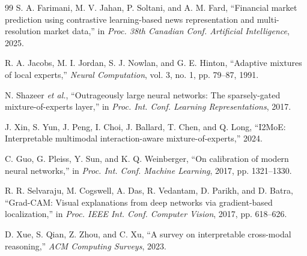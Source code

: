﻿\documentclass[conference]{IEEEtran}
\begin{document}
\begin{thebibliography}{99}
S. A. Farimani, M. V. Jahan, P. Soltani, and A. M. Fard, ``Financial market prediction using contrastive learning-based news representation and multi-resolution market data,'' in \emph{Proc. 38th Canadian Conf. Artificial Intelligence}, 2025.

R. A. Jacobs, M. I. Jordan, S. J. Nowlan, and G. E. Hinton, ``Adaptive mixtures of local experts,'' \emph{Neural Computation}, vol. 3, no. 1, pp. 79--87, 1991.

N. Shazeer \emph{et al.}, ``Outrageously large neural networks: The sparsely-gated mixture-of-experts layer,'' in \emph{Proc. Int. Conf. Learning Representations}, 2017.

J. Xin, S. Yun, J. Peng, I. Choi, J. Ballard, T. Chen, and Q. Long, ``I2MoE: Interpretable multimodal interaction-aware mixture-of-experts,'' 2024.

C. Guo, G. Pleiss, Y. Sun, and K. Q. Weinberger, ``On calibration of modern neural networks,'' in \emph{Proc. Int. Conf. Machine Learning}, 2017, pp. 1321--1330.

R. R. Selvaraju, M. Cogswell, A. Das, R. Vedantam, D. Parikh, and D. Batra, ``Grad-CAM: Visual explanations from deep networks via gradient-based localization,'' in \emph{Proc. IEEE Int. Conf. Computer Vision}, 2017, pp. 618--626.

D. Xue, S. Qian, Z. Zhou, and C. Xu, ``A survey on interpretable cross-modal reasoning,'' \emph{ACM Computing Surveys}, 2023.
\end{thebibliography}
\end{document}
